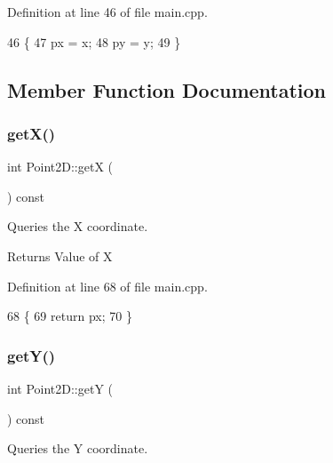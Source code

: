 Definition at line 46 of file main.\+cpp.


\begin{DoxyCode}
46                           \{
47         px = x;
48         py = y;
49     \}
\end{DoxyCode}


\subsection{Member Function Documentation}
\mbox{\label{classPoint2D_a5cb1c2584e5b2bada0226a3e32aa2b1a}} 
\subsubsection{\texorpdfstring{get\+X()}{getX()}}
{\footnotesize\ttfamily int Point2\+D\+::getX (\begin{DoxyParamCaption}{ }\end{DoxyParamCaption}) const\hspace{0.3cm}{\ttfamily [inline]}}



Queries the X coordinate. 

\begin{DoxyReturn}{Returns}
Value of X 
\end{DoxyReturn}


Definition at line 68 of file main.\+cpp.


\begin{DoxyCode}
68                      \{
69         \textcolor{keywordflow}{return} px;
70     \}
\end{DoxyCode}
\mbox{\label{classPoint2D_a53d10f2e460c47a493a3fbadfbafbb64}} 
\subsubsection{\texorpdfstring{get\+Y()}{getY()}}
{\footnotesize\ttfamily int Point2\+D\+::getY (\begin{DoxyParamCaption}{ }\end{DoxyParamCaption}) const\hspace{0.3cm}{\ttfamily [inline]}}



Queries the Y coordinate. 

